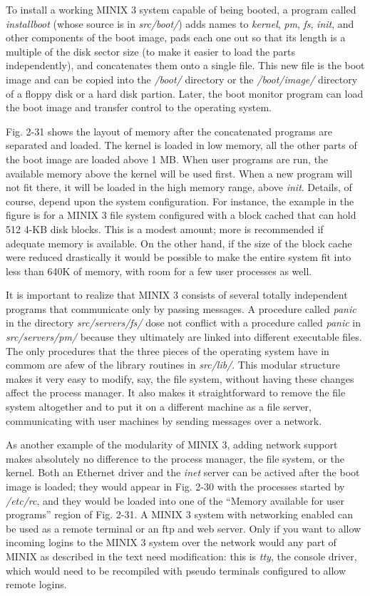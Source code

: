 \documentclass{book}
\newcommand {\sys} [1] {\textsl{#1}}
\begin{document}
To install a working MINIX 3 system capable of being booted, 
a program called \sys{installboot} (whose source is in \sys{src/boot/}) adds names to \sys{kernel}, 
\sys{pm}, \sys{fs}, \sys{init}, and other components of the boot image,
pads each one out so that its length is a multiple of the disk sector size 
(to make it easier to load the parts independently), and concatenates them onto a single file.
This new file is the boot image and can be copied into the \sys{/boot/} directory or 
the \sys{/boot/image/} directory of a floppy disk or a hard disk partion.
Later, the boot monitor program can load the boot image and transfer control to the operating system.

Fig. 2-31 shows the layout of memory after the concatenated programs are separated and loaded.
The kernel is loaded in low memory, all the other parts of the boot image are loaded above 1 MB.
When user programs are run, the available memory above the kernel will be used first.
When a new program will not fit there, it will be loaded in the high memory range, above \sys{init}.
Details, of course, depend upon the system configuration.
For instance, the example in the figure is for a MINIX 3 file system configured with a block cached that can hold 512 4-KB disk blocks.
This is a modest amount; more is recommended if adequate memory is available. 
On the other hand, if the size of the block cache were reduced drastically 
it would be possible to make the entire system fit into less than 640K of memory,
with room for a few user processes as well.

It is important to realize that MINIX 3 consists of several totally independent programs that communicate only by passing messages.
A procedure called \sys{panic} in the directory \sys{src/servers/fs/} dose not conflict with
a procedure called \sys{panic} in \sys{src/servers/pm/} because they ultimately are linked into different executable files.
The only procedures that the three pieces of the operating system have in commom are afew of the library routines in \sys{src/lib/}.
This modular structure makes it very easy to modify, say, the file system, without having these changes affect the process manager.
It also makes it straightforward to remove the file system altogether and to put it on a different machine as a file server,
communicating with user machines by sending messages over a network.

As another example of the modularity of MINIX 3, adding network support makes absolutely no difference to the process manager,
the file system, or the kernel.
Both an Ethernet driver and the \sys{inet} server can be actived after the boot image is loaded;
they would appear in Fig. 2-30 with the processes started by \sys{/etc/rc},
and they would be loaded into one of the ``Memory available for user programs'' region of Fig. 2-31.
A MINIX 3 system with networking enabled can be used as a remote terminal or an ftp and web server.
Only if you want to allow incoming logins to the MINIX 3 system over the network would any part of MINIX as described in the text need modification:
this is \sys{tty}, the console driver, which would need to be recompiled with pseudo terminals configured to allow remote logins.
\end{document}
